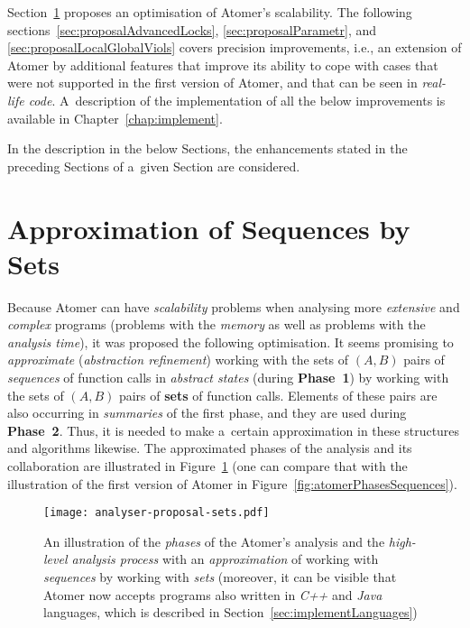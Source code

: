 Section~\ref{sec:proposalSets} proposes an optimisation of Atomer's
scalability. The following sections~\ref{sec:proposalAdvancedLocks},
\ref{sec:proposalParametr}, and \ref{sec:proposalLocalGlobalViols} covers
precision improvements, i.e., an extension of Atomer by additional
features that improve its ability to cope with cases that were not supported
in the first version of Atomer, and that can be seen in \emph{real-life
code}. A~description of the implementation of all the below improvements is 
available in Chapter~\ref{chap:implement}.

In the description in the below Sections, the enhancements stated in the
preceding Sections of a~given Section are considered.


\section{Approximation of Sequences by Sets}
\label{sec:proposalSets}

Because Atomer can have \emph{scalability} problems when analysing
more \emph{extensive} and \emph{complex} programs (problems with the
\emph{memory} as well as problems with the \emph{analysis time}), it was
proposed the following optimisation. It seems promising to
\emph{approximate} (\emph{abstraction refinement}) working with the
sets of ${ (A, B) }$ pairs of \emph{sequences} of function calls in
\emph{abstract states} (during \textbf{Phase~1}) by working with the sets
of ${ (A, B) }$ pairs of \textbf{sets} of function calls. Elements of
these pairs are also occurring in \emph{summaries} of the first phase,
and they are used during \textbf{Phase~2}. Thus, it is needed to make
a~certain approximation in these structures and algorithms likewise.
The approximated phases of the analysis and its collaboration are
illustrated in Figure~\ref{fig:atomerPhasesSets} (one can compare that
with the illustration of the first version of Atomer in
Figure~\ref{fig:atomerPhasesSequences}).

\begin{figure}[hbt]
    \centering
    \texttt{[image: analyser-proposal-sets.pdf]}
    \caption{%
        An illustration of the \emph{phases} of the Atomer's analysis
        and the \emph{high-level analysis process} with an
        \emph{approximation} of working with \emph{sequences} by
        working with \emph{sets} (moreover, it can be visible that
        Atomer now accepts programs also written in \emph{C++} and
        \emph{Java} languages, which is described in
        Section~\ref{sec:implementLanguages})%
    }
    \label{fig:atomerPhasesSets}
\end{figure}

